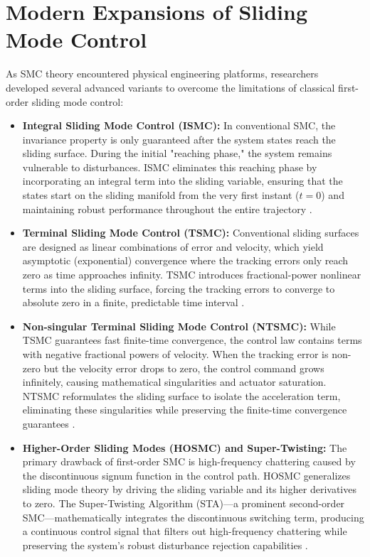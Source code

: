 \section{Modern Expansions of Sliding Mode Control}
As SMC theory encountered physical engineering platforms, researchers developed several advanced variants to overcome the limitations of classical first-order sliding mode control:
\begin{itemize}
    \item \textbf{Integral Sliding Mode Control (ISMC):} In conventional SMC, the invariance property is only guaranteed after the system states reach the sliding surface. During the initial "reaching phase," the system remains vulnerable to disturbances. ISMC eliminates this reaching phase by incorporating an integral term into the sliding variable, ensuring that the states start on the sliding manifold from the very first instant ($t=0$) and maintaining robust performance throughout the entire trajectory \cite{ref_71}.
    \item \textbf{Terminal Sliding Mode Control (TSMC):} Conventional sliding surfaces are designed as linear combinations of error and velocity, which yield asymptotic (exponential) convergence where the tracking errors only reach zero as time approaches infinity. TSMC introduces fractional-power nonlinear terms into the sliding surface, forcing the tracking errors to converge to absolute zero in a finite, predictable time interval \cite{ref_71}.
    \item \textbf{Non-singular Terminal Sliding Mode Control (NTSMC):} While TSMC guarantees fast finite-time convergence, the control law contains terms with negative fractional powers of velocity. When the tracking error is non-zero but the velocity error drops to zero, the control command grows infinitely, causing mathematical singularities and actuator saturation. NTSMC reformulates the sliding surface to isolate the acceleration term, eliminating these singularities while preserving the finite-time convergence guarantees \cite{ref_70}.
    \item \textbf{Higher-Order Sliding Modes (HOSMC) and Super-Twisting:} The primary drawback of first-order SMC is high-frequency chattering caused by the discontinuous signum function in the control path. HOSMC generalizes sliding mode theory by driving the sliding variable and its higher derivatives to zero. The Super-Twisting Algorithm (STA)—a prominent second-order SMC—mathematically integrates the discontinuous switching term, producing a continuous control signal that filters out high-frequency chattering while preserving the system's robust disturbance rejection capabilities \cite{ref_69}.
\end{itemize}

